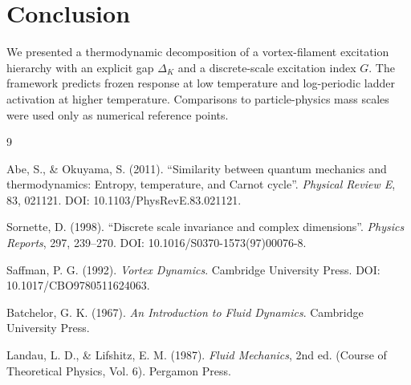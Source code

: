\documentclass[11pt, a4paper]{article}
\begin{document}
\section{Conclusion}
\label{sec:conclusion}

We presented a thermodynamic decomposition of a vortex-filament excitation hierarchy with an explicit gap \(\Delta_K\) and a discrete-scale excitation index \(G\). The framework predicts frozen response at low temperature and log-periodic ladder activation at higher temperature. Comparisons to particle-physics mass scales were used only as numerical reference points.

\begin{thebibliography}{9}

Abe, S., \& Okuyama, S. (2011).
``Similarity between quantum mechanics and thermodynamics: Entropy, temperature, and Carnot cycle''.
\textit{Physical Review E}, 83, 021121.
DOI: 10.1103/PhysRevE.83.021121.

Sornette, D. (1998).
``Discrete scale invariance and complex dimensions''.
\textit{Physics Reports}, 297, 239--270.
DOI: 10.1016/S0370-1573(97)00076-8.

Saffman, P. G. (1992).
\textit{Vortex Dynamics}.
Cambridge University Press.
DOI: 10.1017/CBO9780511624063.

Batchelor, G. K. (1967).
\textit{An Introduction to Fluid Dynamics}.
Cambridge University Press.

Landau, L. D., \& Lifshitz, E. M. (1987).
\textit{Fluid Mechanics}, 2nd ed. (Course of Theoretical Physics, Vol. 6).
Pergamon Press.

\end{thebibliography}
\end{document}
